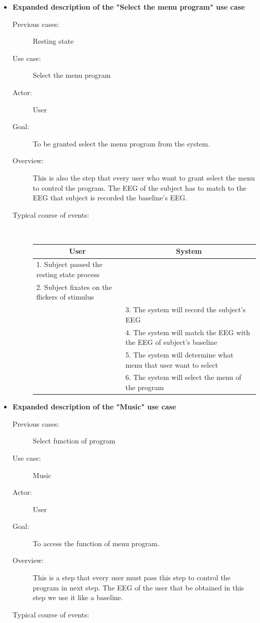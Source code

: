 \begin{itemize}
\begin{description}
{\begin{tabular}{| m{.47\linewidth} | m{.47\linewidth} |}
		\end{tabular}
	}
	
\end{description}

\newpage
\item \textbf{Expanded description of the "Select the menu program" use case }
\begin{description}
	\item [Previous cases:] Resting state
	\item [Use case:] Select the menu program
	\item [Actor:] User  
	\item [Goal:] To be granted select the menu program from the system. 
	\item [Overview:] This is also the step that every user who want to grant select the menu to control the program. The EEG of the subject has to match to the EEG that subject is recorded the baseline’s EEG.
	\item [Typical course of events:]~
	
	{
		\centering
		\begin{tabular}{| m{.47\linewidth} | m{.47\linewidth} |}
			
			\hline 
			\multicolumn{1}{|c}{\textbf{User}} & 
  			\multicolumn{1}{|c|}{\textbf{System}}\\
			\hline 
			1. Subject passed the resting state process &   \\
			\hline 
			2. Subject fixates on the flickers of stimulus   &   \\
			\hline 
			& 3. The system will record the subject's EEG \\
			\hline 
			& 4. The system will match the EEG with the EEG of subject's baseline  \\
			\hline
			& 5. The system will determine what menu that user want to select \\
			\hline
			& 6. The system will select the menu of the program\\
			\hline
			
		\end{tabular}
	}
	
\end{description}

\newpage
\item \textbf{Expanded description of the "Music" use case }
\begin{description}
	\item [Previous cases:] Select function of program
	\item [Use case:] Music
	\item [Actor:] User  
	\item [Goal:] To access the function of menu program. 
	\item [Overview:] This is a step that every user must pass this step to control the program in next step. The EEG of the user that be obtained in this step we use it like a baseline. 
	\item [Typical course of events:]~
	

\end{description}
\end{itemize}
